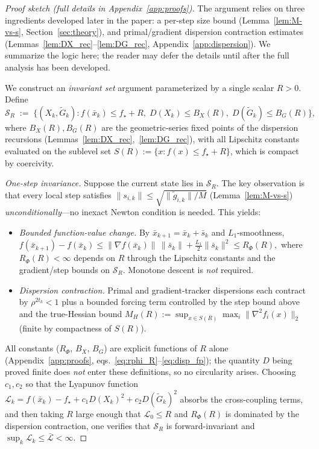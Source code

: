 \documentclass[11pt,a4paper]{article}
\begin{document}
	\begin{proof}[Proof sketch (full details in Appendix~\ref{app:proofs})]
	The argument relies on three ingredients developed later in the
	paper: a per-step size bound
	(Lemma~\ref{lem:M-vs-s}, Section~\ref{sec:theory}),
	and primal/gradient dispersion contraction estimates
	(Lemmas~\ref{lem:DX_rec}--\ref{lem:DG_rec},
	Appendix~\ref{app:dispersion}).
	We summarize the logic here; the reader may defer the details
	until after the full analysis has been developed.

	We construct an \emph{invariant set} argument parameterized by
	a single scalar $R>0$.
	Define
	\[
	  \mathcal S_R \;:=\;
	  \bigl\{(X_k,\tilde G_k) :
	  f(\bar x_k)\le f_\star+R,\;
	  D(X_k)\le B_X(R),\;
	  D(\tilde G_k)\le B_G(R)\bigr\},
	\]
	where $B_X(R),B_G(R)$ are the geometric-series fixed points of the
	dispersion recursions (Lemmas~\ref{lem:DX_rec},~\ref{lem:DG_rec}),
	with all Lipschitz constants evaluated on the sublevel set
	$S(R):=\{x:f(x)\le f_\star+R\}$, which is compact by coercivity.

	\emph{One-step invariance.}
	Suppose the current state lies in $\mathcal S_R$.
	The key observation is that every local step satisfies
	$\|s_{i,k}\|\le\sqrt{\|\tilde g_{i,k}\|/M}$
	(Lemma~\ref{lem:M-vs-s})
	\emph{unconditionally}---no inexact Newton condition is needed.
	This yields:
	\begin{itemize}[leftmargin=1.2em,itemsep=1pt]
	  \item \emph{Bounded function-value change.}
	        By $\bar x_{k+1}=\bar x_k+\bar s_k$ and $L_1$-smoothness,
	        \(
	        f(\bar x_{k+1})-f(\bar x_k)
	        \le \|\nabla f(\bar x_k)\|\,\|\bar s_k\|
	            +\tfrac{L_1}{2}\|\bar s_k\|^2
	        \le R_\Phi(R),
	        \)
	        where $R_\Phi(R)<\infty$ depends on $R$ through the Lipschitz
	        constants and the gradient/step bounds on $\mathcal S_R$.
	        Monotone descent is \emph{not} required.
	  \item \emph{Dispersion contraction.}
	        Primal and gradient-tracker dispersions each contract by
	        $\rho^{2t_k}<1$ plus a bounded forcing term controlled by
	        the step bound above and the true-Hessian bound
	        $M_H(R):=\sup_{x\in S(R)}\max_i\|\nabla^2 f_i(x)\|_2$
	        (finite by compactness of $S(R)$).
	\end{itemize}
	All constants ($R_\Phi$, $B_X$, $B_G$) are explicit functions of
	$R$ alone (Appendix~\ref{app:proofs},
	eqs.~\eqref{eq:rphi_R}--\eqref{eq:disp_fp});
	the quantity $D$ being proved finite does \emph{not} enter these
	definitions, so no circularity arises.
	Choosing $c_1,c_2$ so that the Lyapunov function
	$\mathcal L_k=f(\bar x_k)-f_\star+c_1D(X_k)^2+c_2D(\tilde G_k)^2$
	absorbs the cross-coupling terms, and then taking $R$ large enough
	that $\mathcal L_0\le R$ and $R_\Phi(R)$ is dominated by the
	dispersion contraction, one verifies that $\mathcal S_R$ is
	forward-invariant and
	$\sup_{k}\mathcal L_k\le\bar{\mathcal L}<\infty$.


\end{proof}
\end{document}
